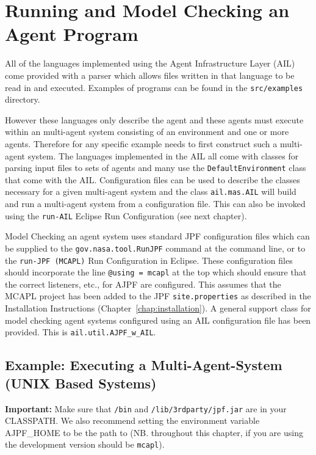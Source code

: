 \chapter{Running and Model Checking an Agent Program}
\label{chap:running}

All of the languages implemented using the Agent Infrastructure Layer (AIL) come provided with a parser which allows files written in that language to be read in and executed.  Examples of programs can be found in the \texttt{src/examples} directory.

However these languages only describe the agent and these agents must execute within an multi-agent system consisting of an environment and one or more agents.  Therefore for any specific example needs to first construct such a multi-agent system.  The languages implemented in the AIL all come with classes for parsing input files to sets of agents and many use the \texttt{DefaultEnvironment} class that come with the AIL. Configuration files can be used to describe the classes necessary  for a given multi-agent system and the class \texttt{ail.mas.AIL} will build and run a multi-agent system from a configuration file.  This can also be invoked using the \texttt{run-AIL} Eclipse Run Configuration (see next chapter).

Model Checking an agent system uses standard JPF configuration files which can be supplied to the \texttt{gov.nasa.tool.RunJPF} command at the command line, or to the \texttt{run-JPF (MCAPL)} Run Configuration in Eclipse.  These configuration files should incorporate the line \texttt{@using = mcapl} at the top which should ensure that the correct listeners, etc., for AJPF are configured.  This assumes that the MCAPL project has been added to the JPF \texttt{site.properties} as described in the Installation Instructions (Chapter~\ref{chap:installation}).  A general support class for model checking agent systems configured using an AIL configuration file has been provided.  This is \texttt{ail.util.AJPF\_w\_AIL}. 

\section{Example: Executing a Multi-Agent-System (UNIX Based Systems)}
{\bf Important:} Make sure that \texttt{\ajpfversion/bin} and \texttt{\ajpfversion/lib/3rdparty/jpf.jar} are in your CLASSPATH.  We also recommend setting the environment variable AJPF\_HOME to be the path to \texttt{\ajpfversion} (NB. throughout this chapter, if you are using the development version \texttt{\ajpfversion} should be \texttt{mcapl}).

